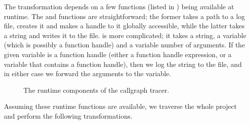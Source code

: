 The transformation depends on a few functions (listed in
) being available at runtime. The
 and  functions
are straightforward; the former takes a path to a log file, creates it and
makes a handle to it globally accessible, while the latter takes a string and
writes it to the file. \newline {} is more
complicated; it takes a string, a variable (which is possibly a function
handle) and a variable number of arguments. If the given variable is a function
handle (either a function handle expression, or a variable that contains a
function handle), then we log the string to the file, and in either case we
forward the arguments to the variable.

\begin{figure}[htbp]

\caption{The runtime components of the callgraph tracer.}
\label{Fig:CallgraphRuntime}
\end{figure}

Assuming these runtime functions are available, we traverse the whole project
and perform the following transformations.

